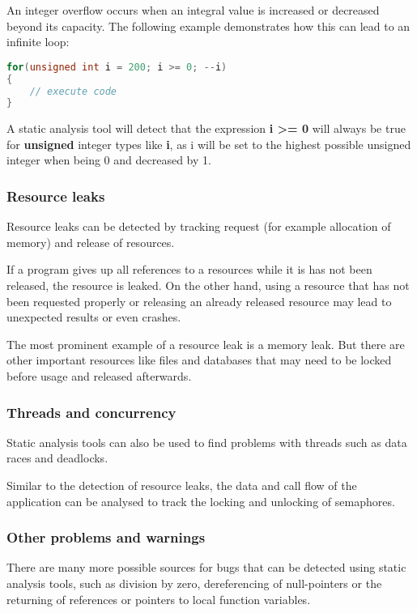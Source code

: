 An integer overflow occurs when an integral value is increased or decreased beyond its capacity. The following example demonstrates how this can lead to an infinite loop:

\begin{lstlisting}[language=C++, caption=Integer ''underflow'' in C++]
for(unsigned int i = 200; i >= 0; --i)
{
	// execute code
}
\end{lstlisting}

A static analysis tool will detect that the expression \textbf{i \textgreater= 0} will always be true for \textbf{unsigned} integer types like \textbf{i}, as i will be set to the highest possible unsigned integer when being 0 and decreased by 1.

\subsubsection{Resource leaks}

Resource leaks can be detected by tracking request (for example allocation of memory) and release of resources.

If a program gives up all references to a resources while it is has not been released, the resource is leaked. On the other hand, using a resource that has not been requested properly or releasing an already released resource may lead to unexpected results or even crashes.

The most prominent example of a resource leak is a memory leak. But there are other important resources like files and databases that may need to be locked before usage and released afterwards.

\subsubsection{Threads and concurrency}

Static analysis tools can also be used to find problems with threads such as data races and deadlocks.

Similar to the detection of resource leaks, the data and call flow of the application can be analysed to track the locking and unlocking of semaphores.

\subsubsection{Other problems and warnings}

There are many more possible sources for bugs that can be detected using static analysis tools, such as division by zero, dereferencing of null-pointers or the returning of references or pointers to local function variables.

